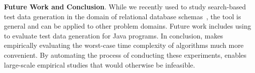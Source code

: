 {\bf Future Work and Conclusion}.  While we recently used \toolname to study
search-based test data generation in the domain of relational database
schemas~\cite{kinneer2015}, the tool is general and can be applied to
other problem domains. Future work includes using \toolname to evaluate test
data generation for Java programs.  In conclusion, \toolname makes empirically
evaluating the worst-case time complexity of algorithms much more convenient.
By automating the process of conducting these experiments, \toolname enables
large-scale empirical studies that would otherwise be infeasible.


